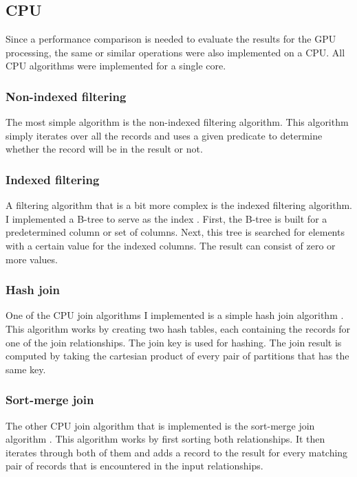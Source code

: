 \documentclass[a4paper,titlepage]{article}
\begin{document}
\subsection{CPU}
\label{sec:cpu-implementation}
Since a performance comparison is needed to evaluate the results for the GPU processing, the same or similar operations were also implemented on a CPU. All CPU algorithms were implemented for a single core.

\subsubsection{Non-indexed filtering}
The most simple algorithm is the non-indexed filtering algorithm. This algorithm simply iterates over all the records and uses a given predicate to determine whether the record will be in the result or not.

\subsubsection{Indexed filtering}
A filtering algorithm that is a bit more complex is the indexed filtering algorithm. I implemented a B-tree to serve as the index \cite{comer1979}. First, the B-tree is built for a predetermined column or set of columns. Next, this tree is searched for elements with a certain value for the indexed columns. The result can consist of zero or more values.

\subsubsection{Hash join}
One of the CPU join algorithms I implemented is a simple hash join algorithm \cite{dewitt1985}. This algorithm works by creating two hash tables, each containing the records for one of the join relationships. The join key is used for hashing. The join result is computed by taking the cartesian product of every pair of partitions that has the same key.

\subsubsection{Sort-merge join}
The other CPU join algorithm that is implemented is the sort-merge join algorithm \cite{blasgen1977}. This algorithm works by first sorting both relationships. It then iterates through both of them and adds a record to the result for every matching pair of records that is encountered in the input relationships.
\end{document}

